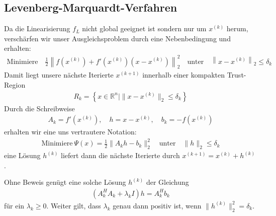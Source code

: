 \subsection{Levenberg-Marquardt-Verfahren}
Da die Linearisierung $f_L$ nicht global geeignet ist sondern nur um $x^{(k)}$ herum, verschärfen wir unser 
Ausgleichsproblem durch eine Nebenbedingung und erhalten:
\begin{align*}
  \text{Minimiere} \quad \frac{1}{2} \left\| f(x^{(k)}) + f'(x^{(k)})(x - x^{(k)}) \right\|_2^2 \quad \text{unter} \quad \left\| x - x^{(k)} \right\|_2 \leq \delta_k
\end{align*}
Damit liegt unsere nächste Iterierte $x^{(k+1)}$ innerhalb einer kompakten Trust-Region
\begin{align*}
  R_k = \left\{ x \in \mathbb{R}^n \mid \|x - x^{(k)}\|_2 \leq \delta_k \right\}
\end{align*}
Durch die Schreibweise
\begin{align*}
  A_k = f'(x^{(k)}), \quad h = x - x^{(k)}, \quad b_k = -f(x^{(k)})
\end{align*}
erhalten wir eine uns vertrautere Notation:
\begin{align*}
  \text{Minimiere} \ \Psi(x) = \frac{1}{2} \|A_k h - b_k\|_2^2 \quad \text{unter} \quad \|h\|_2 \leq \delta_k
\end{align*}
eine Lösung $h^{(k)}$ liefert dann die nächste Iterierte durch $x^{(k+1)} = x^{(k)} + h^{(k)}$.

Ohne Beweis genügt eine solche Lösung $h^{(k)}$ der Gleichung
\begin{align*}
  (A_k^H A_k + \lambda_k I) h = A_k^H b_k
\end{align*}
für ein $\lambda_k \geq 0$. Weiter gilt, dass $\lambda_k$ genau dann positiv ist, wenn $\|h^{(k)}\|_2^2 = \delta_k$.